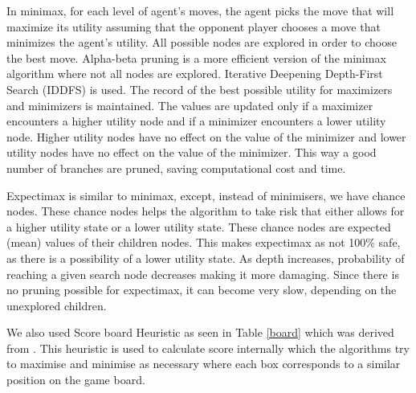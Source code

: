 \documentclass{svproc}
\begin{document}
In minimax, for each level of agent's moves, the agent picks the move that will maximize its utility assuming that the opponent player chooses a move that minimizes the agent’s utility. All possible nodes are explored in order to choose the best move.
Alpha-beta pruning is a more efficient version of the minimax algorithm where not all nodes are explored. Iterative Deepening Depth-First Search (IDDFS) is used. The record of the best possible utility for maximizers and minimizers is maintained.  The values are updated only if a maximizer encounters a higher utility node and if a minimizer encounters a lower utility node. Higher utility nodes have no effect on the value of the minimizer and lower utility nodes have no effect on the value of the minimizer. This way a good number of branches are pruned, saving computational cost and time.

Expectimax is similar to minimax, except, instead of minimisers, we have chance nodes. These chance nodes helps the algorithm to take risk that either allows for a higher utility state or a lower utility state. These chance nodes are expected (mean) values of their children nodes. This makes expectimax as not 100\% safe, as there is a possibility of a lower utility state. As depth increases, probability of reaching a given search node decreases making it more damaging. Since there is no pruning possible for expectimax, it can become very slow, depending on the unexplored children.

We also used Score board Heuristic as seen in Table \ref{board} which was derived from \cite{hboard}. This heuristic is used to calculate score internally which the algorithms try to maximise and minimise as necessary where each box corresponds to a similar position on the game board.

\begin{table}[H]
\centering
\begin{adjustbox}{width=4cm,center}
\end{adjustbox}
\caption{Score Board Heuristic}
\label{board}
\end{table}
\end{document}

